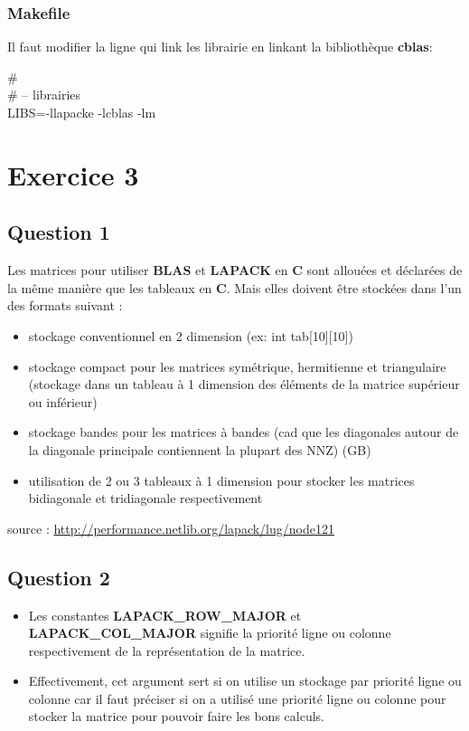 \documentclass[11pt]{article}
\begin{document}
\subsubsection{Makefile}

Il faut modifier la ligne qui link les librairie en linkant la
bibliothèque \textbf{cblas}:

\# \\
\# -- librairies \\
LIBS=-llapacke -lcblas -lm \\

\section{Exercice 3}
\subsection{Question 1}

Les matrices pour utiliser \textbf{BLAS} et \textbf{LAPACK} en \textbf{C} sont allouées
et déclarées de la même manière que les tableaux en \textbf{C}. Mais elles
doivent être stockées dans l'un des formats suivant :

\begin{itemize}
\item stockage conventionnel en 2 dimension (ex: int tab[10][10])
\item stockage compact pour les matrices symétrique, hermitienne et
  triangulaire (stockage dans un tableau à 1 dimension des éléments
  de la matrice supérieur ou inférieur)
\item stockage bandes pour les matrices à bandes (cad que les
  diagonales autour de la diagonale principale contiennent la
  plupart des NNZ) (GB)
\item utilisation de 2 ou 3 tableaux à 1 dimension pour stocker les
  matrices bidiagonale et tridiagonale respectivement
\end{itemize}

source : \url{http://performance.netlib.org/lapack/lug/node121}

\subsection{Question 2}

\begin{itemize}
\item Les constantes \textbf{LAPACK\_ROW\_MAJOR} et \textbf{LAPACK\_COL\_MAJOR}
  signifie la priorité ligne ou colonne respectivement de la
  représentation de la matrice.
\item Effectivement, cet argument sert si on utilise un stockage
  par priorité ligne ou colonne car il faut préciser si on a utilisé
  une priorité ligne ou colonne pour stocker la matrice pour pouvoir
  faire les bons calculs.
\end{itemize}
\end{document}
